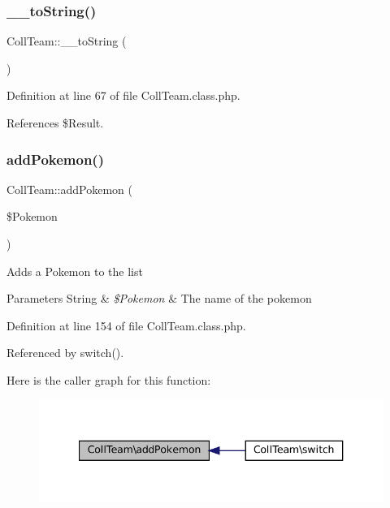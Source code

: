 \subsubsection{\texorpdfstring{\+\_\+\+\_\+to\+String()}{\_\_toString()}}
{\footnotesize\ttfamily Coll\+Team\+::\+\_\+\+\_\+to\+String (\begin{DoxyParamCaption}{ }\end{DoxyParamCaption})}



Definition at line 67 of file Coll\+Team.\+class.\+php.



References \$\+Result.

\mbox{\label{class_coll_team_af5b06e3dd4ea23759930780ab4801ff4}} 
\subsubsection{\texorpdfstring{add\+Pokemon()}{addPokemon()}}
{\footnotesize\ttfamily Coll\+Team\+::add\+Pokemon (\begin{DoxyParamCaption}\item[{}]{\$\+Pokemon }\end{DoxyParamCaption})}

Adds a Pokemon to the list 
\begin{DoxyParams}[1]{Parameters}
String & {\em \$\+Pokemon} & The name of the pokemon \\
\hline
\end{DoxyParams}


Definition at line 154 of file Coll\+Team.\+class.\+php.



Referenced by switch().

Here is the caller graph for this function\+:\nopagebreak
\begin{figure}[H]
\begin{center}
\leavevmode
\includegraphics[width=340pt]{class_coll_team_af5b06e3dd4ea23759930780ab4801ff4_icgraph}
\end{center}
\end{figure}
\mbox{\label{class_coll_team_a11c61e291459ab9063885e1a94d12a8c}} 
